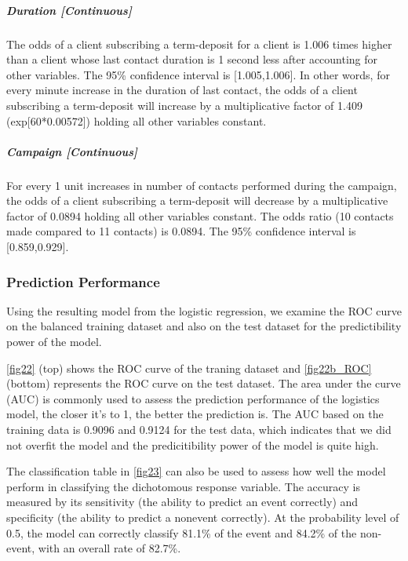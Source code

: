 \documentclass[]{article}
\let\oldsubparagraph\subparagraph
\renewcommand{\subparagraph}[1]{\oldsubparagraph{#1}\mbox{}}
\begin{document}
\subparagraph{Duration {[}Continuous{]}}\label{duration-continuous}

The odds of a client subscribing a term-deposit for a client is 1.006
times higher than a client whose last contact duration is 1 second less
after accounting for other variables. The 95\% confidence interval is
{[}1.005,1.006{]}. In other words, for every minute increase in the
duration of last contact, the odds of a client subscribing a
term-deposit will increase by a multiplicative factor of 1.409
(exp{[}60*0.00572{]}) holding all other variables constant.

\subparagraph{Campaign {[}Continuous{]}}\label{campaign-continuous}

For every 1 unit increases in number of contacts performed during the
campaign, the odds of a client subscribing a term-deposit will decrease
by a multiplicative factor of 0.0894 holding all other variables
constant. The odds ratio (10 contacts made compared to 11 contacts) is
0.0894. The 95\% confidence interval is {[}0.859,0.929{]}.

\subsubsection{Prediction Performance}\label{prediction-performance}

Using the resulting model from the logistic regression, we examine the
ROC curve on the balanced training dataset and also on the test dataset
for the predictibility power of the model.

\autoref{fig22} (top) shows the ROC curve of the traning dataset and
\autoref{fig22b_ROC} (bottom) represents the ROC curve on the test
dataset. The area under the curve (AUC) is commonly used to assess the
prediction performance of the logistics model, the closer it's to 1, the
better the prediction is. The AUC based on the training data is 0.9096
and 0.9124 for the test data, which indicates that we did not overfit
the model and the predicitibility power of the model is quite high.

The classification table in \autoref{fig23} can also be used to assess
how well the model perform in classifying the dichotomous response
variable. The accuracy is measured by its sensitivity (the ability to
predict an event correctly) and specificity (the ability to predict a
nonevent correctly). At the probability level of 0.5, the model can
correctly classify 81.1\% of the event and 84.2\% of the non-event, with
an overall rate of 82.7\%.
\end{document}
